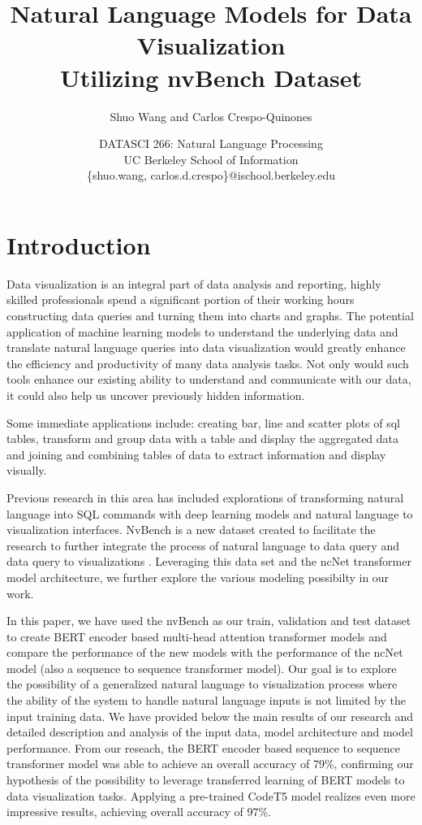 \documentclass[
	a4paper, %
	10pt, %
	unnumberedsections, %
	twoside, %
]{t0003}
\title{Natural Language Models for Data Visualization\\ Utilizing nvBench Dataset} %
\author{
	Shuo Wang and Carlos Crespo-Quinones
}
\date{\footnotesize DATASCI 266: Natural Language Processing \\ UC Berkeley School of Information \\ \{shuo.wang, carlos.d.crespo\}@ischool.berkeley.edu}
\begin{document}
\maketitle %


\section{Introduction}

Data visualization is an integral part of data analysis and reporting, highly skilled professionals spend a significant portion of their working hours constructing data queries and turning them into charts and graphs. The potential application of machine learning models to understand the underlying data and translate natural language queries into data visualization would greatly enhance the efficiency and productivity of many data analysis tasks. Not only would such tools enhance our existing ability to understand and communicate with our data, it could also help us uncover previously hidden information.

Some immediate applications include: creating bar, line and scatter plots of sql tables, transform and group data with a table and display the aggregated data and joining and combining tables of data to extract information and display visually.

Previous research in this area has included explorations of transforming natural language into SQL commands\cite{Zhong:2017qr, Yu:2019qr} with deep learning models and natural language to visualization interfaces\cite{Cox:2001qr}. NvBench is a new dataset created to facilitate the research to further integrate the process of natural language to data query and data query to visualizations\cite{Luo:2021qr} . Leveraging this data set and the ncNet transformer model architecture\cite{Luo:2022qr}, we further explore the various modeling possibilty in our work.

In this paper, we have used the nvBench as our train, validation and test dataset to create BERT encoder based multi-head attention transformer models and compare the performance of the new models with the performance of the ncNet model (also a sequence to sequence transformer model). Our goal is to explore the possibility of a generalized natural language to visualization process where the ability of the system to handle natural language inputs is not limited by the input training data. We have provided below the main results of our research and detailed description and analysis of the input data, model architecture and model performance.
From our reseach, the BERT encoder based sequence to sequence transformer model was able to achieve an overall accuracy of 79\%, confirming our hypothesis of the possibility to leverage transferred learning of BERT models to data visualization tasks. Applying a pre-trained CodeT5 model realizes even more impressive results, achieving overall accuracy of 97\%.
\end{document}
